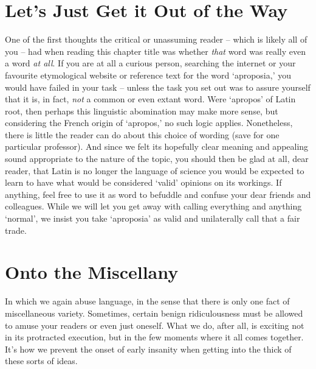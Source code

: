 \section{Let's Just Get it Out of the Way}
\label{sec:aproposia-is-not-a-word}
\noindent One of the first thoughts the critical or unassuming reader -- which is likely all of you -- had when reading this chapter title was whether \emph{that} word was really even a word \emph{at all}. If you are at all a curious person, searching the internet or your favourite etymological website or reference text for the word `aproposia,' you would have failed in your task -- unless the task you set out was to assure yourself that it is, in fact, \emph{not} a common or even extant word. Were `apropos' of Latin root, then perhaps this linguistic abomination may make more sense, but considering the French origin of `apropos,' no such logic applies. Nonetheless, there is little the reader can do about this choice of wording (save for one particular professor). And since we felt its hopefully clear meaning and appealing sound appropriate to the nature of the topic, you should then be glad at all, dear reader, that Latin is no longer the language of science you would be expected to learn to have what would be considered `valid' opinions on its workings. If anything, feel free to use it as word to befuddle and confuse your dear friends and colleagues. While we will let you get away with calling everything and anything `normal', we insist you take `aproposia' as valid and unilaterally call that a fair trade.

\section{Onto the Miscellany}

In which we again abuse language, in the sense that there is only one fact of miscellaneous variety. Sometimes, certain benign ridiculousness must be allowed to amuse your readers or even just oneself. What we do, after all, is exciting not in its protracted execution, but in the few moments where it all comes together. It's how we prevent the onset of early insanity when getting into the thick of these sorts of ideas.

